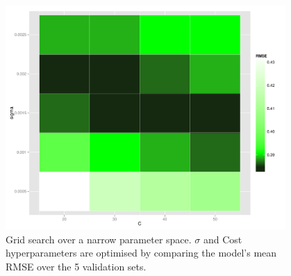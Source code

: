 \documentclass[]{article}
\begin{document}
\begin{figure}[ht]
  \centering
  \includegraphics[width=0.95\textwidth]{./figures_si/grid_search.pdf}
  \caption{Grid search over a narrow parameter space. $\sigma$ and Cost
    hyperparameters are optimised by comparing the model's mean RMSE over the 5
    validation sets.}
  \label{fig:grid_search}
\end{figure}

\end{document}
